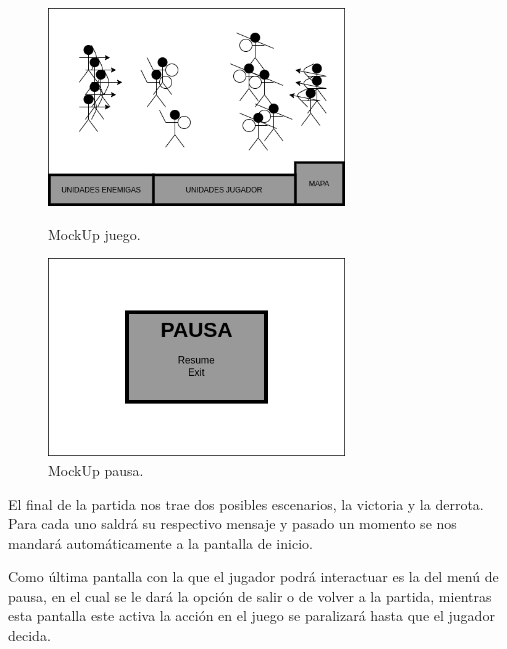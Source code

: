 \begin{figure}[ht]
\centering
\begin{minipage}[c]{0.45\linewidth}
	\hspace{9mm}
	\includegraphics[width=0.7\textwidth]{imagenes/gdd/pantallas/Pantalla_gameplay.png}
	\caption{MockUp juego.}
	\label{mockup_juego}
\end{minipage}
\begin{minipage}[c]{0.45\linewidth}
	\hspace{9mm}
	\includegraphics[width=0.7\textwidth]{imagenes/gdd/pantallas/Pantalla_pausa.png}
	\caption{MockUp pausa.}
	\label{mockup_pausa}
\end{minipage}	
\end{figure}

El final de la partida nos trae dos posibles escenarios, la victoria y la derrota. 
Para cada uno saldrá su respectivo mensaje y pasado un momento se nos mandará automáticamente a 
la pantalla de inicio.

Como última pantalla con la que el jugador podrá interactuar es la del menú de
pausa, en el cual se le dará la opción de salir o de volver a la
partida, mientras esta pantalla este activa la acción en el juego se paralizará hasta
que el jugador decida. 

